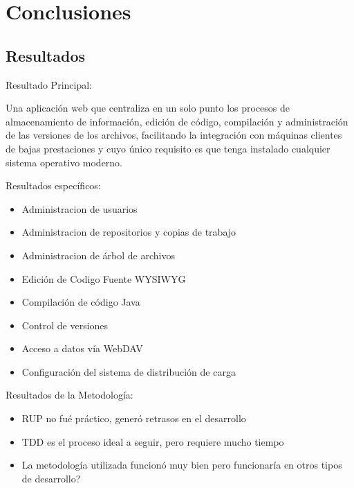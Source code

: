 \section{Conclusiones}

\subsection{Resultados}

\begin{frame}{Resultado Principal:\newline}

Una aplicación web que centraliza en un solo punto los procesos de almacenamiento de información, edición de código, compilación y administración de las versiones de los archivos, facilitando la integración con máquinas clientes de bajas prestaciones y cuyo único requisito es que tenga instalado cualquier sistema operativo moderno.

\end{frame}

\begin{frame}{Resultados específicos:\newline}

\begin{itemize}
	
	\item Administracion de usuarios
	\item Administracion de repositorios y copias de trabajo
	\item Administracion de árbol de archivos
	\item Edición de Codigo Fuente WYSIWYG
	\item Compilación de código Java
	\item Control de versiones
	\item Acceso a datos vía WebDAV
	\item Configuración del sistema de distribución de carga
	
\end{itemize}

\end{frame}


\begin{frame}{Resultados de la Metodología:\newline}

\begin{itemize}
	
	\item RUP no fué práctico, generó retrasos en el desarrollo
	\pause
	
	\item TDD es el proceso ideal a seguir, pero requiere mucho tiempo
	\pause	
	
	\item La metodología utilizada funcionó muy bien pero funcionaría en otros tipos de desarrollo?
	
\end{itemize}

\end{frame}
